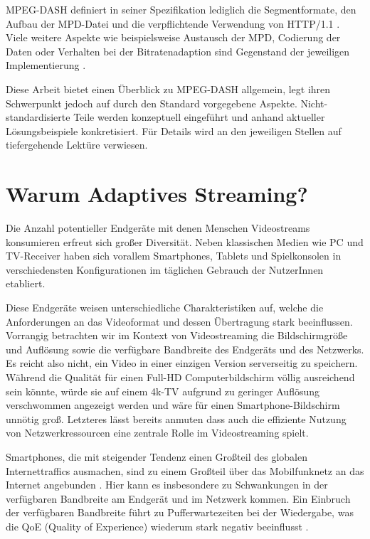 \documentclass[paper = a4, fontsize = 12pt, parskip = half]{scrartcl} %
\begin{document}
MPEG-DASH definiert in seiner Spezifikation lediglich die Segmentformate, den Aufbau der MPD-Datei und die verpflichtende Verwendung von HTTP/1.1 \cite{mpeg_dynamic_2013}. Viele weitere Aspekte wie beispielsweise Austausch der MPD, Codierung der Daten oder Verhalten bei der Bitratenadaption sind Gegenstand der jeweiligen Implementierung \cite{sodagar_mpeg-dash_2011}.

Diese Arbeit bietet einen Überblick zu MPEG-DASH allgemein, legt ihren Schwerpunkt jedoch auf durch den Standard vorgegebene Aspekte.
Nicht-standardisierte Teile werden konzeptuell eingeführt und anhand aktueller Lösungsbeispiele konkretisiert. Für Details wird an den jeweiligen Stellen auf tiefergehende Lektüre verwiesen.

\section{Warum Adaptives Streaming?}
Die Anzahl potentieller Endgeräte mit denen Menschen Videostreams konsumieren erfreut sich großer Diversität. Neben klassischen Medien wie PC und TV-Receiver haben sich vorallem Smartphones, Tablets und Spielkonsolen in verschiedensten Konfigurationen im täglichen Gebrauch der NutzerInnen etabliert.

Diese Endgeräte weisen unterschiedliche Charakteristiken auf, welche die Anforderungen an das Videoformat und dessen Übertragung stark beeinflussen. Vorrangig betrachten wir im Kontext von Videostreaming die Bildschirmgröße und Auflösung sowie die verfügbare Bandbreite des Endgeräts und des Netzwerks.
Es reicht also nicht, ein Video in einer einzigen Version serverseitig zu speichern. Während die Qualität für einen Full-HD Computerbildschirm völlig ausreichend sein könnte, würde sie auf einem 4k-TV aufgrund zu geringer Auflösung verschwommen angezeigt werden und wäre für einen Smartphone-Bildschirm unnötig groß. Letzteres lässt bereits anmuten dass auch die effiziente Nutzung von Netzwerkressourcen eine zentrale Rolle im Videostreaming spielt.

Smartphones, die mit steigender Tendenz einen Großteil des globalen Internettraffics ausmachen, sind zu einem Großteil über das Mobilfunknetz an das Internet angebunden \cite{cisco_syst_inc_cisco_2017}. Hier kann es insbesondere zu Schwankungen in der verfügbaren Bandbreite am Endgerät und im Netzwerk kommen. Ein Einbruch der verfügbaren Bandbreite führt zu Pufferwartezeiten bei der Wiedergabe, was die QoE (Quality of Experience) wiederum stark negativ beeinflusst \cite{seufert_survey_2015}.
\end{document}
